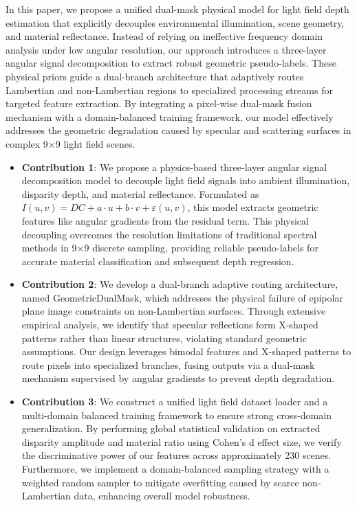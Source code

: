 \documentclass[lettersize,journal]{IEEEtran}
\begin{document}
In this paper, we propose a unified dual-mask physical model for light field depth estimation that explicitly decouples environmental illumination, scene geometry, and material reflectance. Instead of relying on ineffective frequency domain analysis under low angular resolution, our approach introduces a three-layer angular signal decomposition to extract robust geometric pseudo-labels. These physical priors guide a dual-branch architecture that adaptively routes Lambertian and non-Lambertian regions to specialized processing streams for targeted feature extraction. By integrating a pixel-wise dual-mask fusion mechanism with a domain-balanced training framework, our model effectively addresses the geometric degradation caused by specular and scattering surfaces in complex 9×9 light field scenes.

\begin{itemize}
 \item \textbf{Contribution 1}: We propose a physics-based three-layer angular signal decomposition model to decouple light field signals into ambient illumination, disparity depth, and material reflectance. Formulated as $I(u,v) = DC + a \cdot u + b \cdot v + \varepsilon(u,v)$, this model extracts geometric features like angular gradients from the residual term. This physical decoupling overcomes the resolution limitations of traditional spectral methods in 9×9 discrete sampling, providing reliable pseudo-labels for accurate material classification and subsequent depth regression.
 \item \textbf{Contribution 2}: We develop a dual-branch adaptive routing architecture, named GeometricDualMask, which addresses the physical failure of epipolar plane image constraints on non-Lambertian surfaces. Through extensive empirical analysis, we identify that specular reflections form X-shaped patterns rather than linear structures, violating standard geometric assumptions. Our design leverages bimodal features and X-shaped patterns to route pixels into specialized branches, fusing outputs via a dual-mask mechanism supervised by angular gradients to prevent depth degradation.
 \item \textbf{Contribution 3}: We construct a unified light field dataset loader and a multi-domain balanced training framework to ensure strong cross-domain generalization. By performing global statistical validation on extracted disparity amplitude and material ratio using Cohen's d effect size, we verify the discriminative power of our features across approximately 230 scenes. Furthermore, we implement a domain-balanced sampling strategy with a weighted random sampler to mitigate overfitting caused by scarce non-Lambertian data, enhancing overall model robustness.
\end{itemize}
\end{document}
